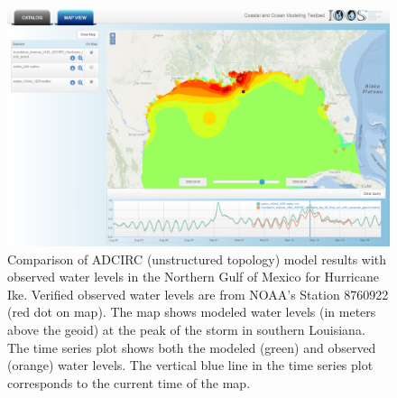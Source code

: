 \begin{figure}[ht!]
  \centering
  \includegraphics[width=\columnwidth]{../figs/SciWMS_ModelObsComparison}
  \caption{Comparison of ADCIRC (unstructured topology) model results
    with observed water levels in the Northern Gulf of Mexico for
    Hurricane Ike. Verified observed water levels are from NOAA's
    Station 8760922 (red dot on map). The map shows modeled water
    levels (in meters above the geoid) at the peak of the storm in
    southern Louisiana. The time series plot shows both the modeled
    (green) and observed (orange) water levels. The vertical blue line
    in the time series plot corresponds to the current time of the
    map.}
  \label{fig:adcirc_comp}
\end{figure}

\newif\ifpltsub


